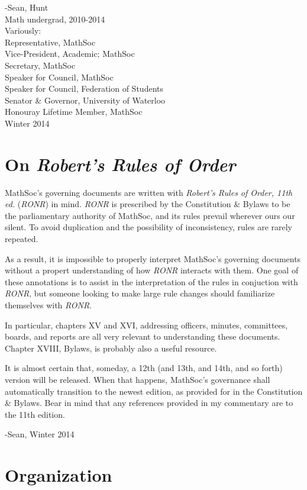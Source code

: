 -Sean, Hunt\\
Math undergrad, 2010-2014\\
Variously:\\
\indent Representative, MathSoc\\
\indent Vice-President, Academic; MathSoc\\
\indent Secretary, MathSoc\\
\indent Speaker for Council, MathSoc\\
\indent Speaker for Council, Federation of Students\\
\indent Senator \& Governor, University of Waterloo\\
\indent Honouray Lifetime Member, MathSoc\\
Winter 2014

\section{On \emph{Robert's Rules of Order}}

MathSoc's governing documents are written with \emph{Robert's Rules of Order,
11th ed.} (\emph{RONR}) in mind. \emph{RONR} is prescribed by the Constitution
\& Bylaws to be the parliamentary authority of MathSoc, and its rules prevail
wherever ours our silent. To avoid duplication and the possibility of
inconsistency, rules are rarely repeated.

As a result, it is impossible to properly interpret MathSoc's governing
documents without a propert understanding of how \emph{RONR} interacts
with them. One goal of these annotations is to assist in the interpretation of
the rules in conjuction with \emph{RONR}, but someone looking to make
large rule changes should familiarize themselves with \emph{RONR}.

In particular, chapters XV and XVI, addressing officers, minutes, committees,
boards, and reports are all very relevant to understanding these documents.
Chapter XVIII, Bylaws, is probably also a useful resource.

It is almost certain that, someday, a 12th (and 13th, and 14th, and so forth)
version will be released. When that happens, MathSoc's governance shall
automatically transition to the newest edition, as provided for in the
Constitution \& Bylaws. Bear in mind that any references provided in my
commentary are to the 11th edition.

-Sean, Winter 2014

\section{Organization}

